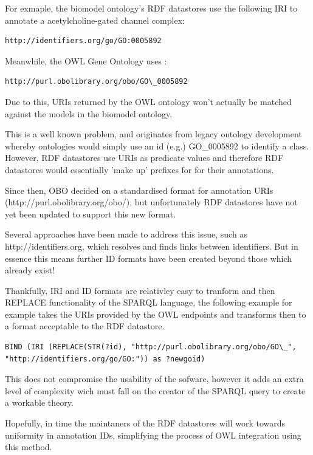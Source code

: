 \documentclass{article}
\begin{document}
For exmaple, the biomodel ontology's RDF datastores use the following IRI to annotate a
acetylcholine-gated channel complex:

\begin{lstlisting}
http://identifiers.org/go/GO:0005892
\end{lstlisting}

Meanwhile, the OWL Gene Ontology uses :

\begin{lstlisting}
http://purl.obolibrary.org/obo/GO\_0005892
\end{lstlisting}

Due to this, URIs returned by the OWL ontology won't actually be matched against
the models in the biomodel ontology.

This is a well known problem, and originates from legacy ontology development
whereby ontologies would simply use an id (e.g.) GO\_0005892 to identify a class.
However, RDF datastores use URIs as predicate values and therefore RDF
datastores would essentially 'make up' prefixes for for their annotations.

Since then, OBO decided on a standardised format for annotation URIs
(http://purl.obolibrary.org/obo/), but unfortunately RDF datastores have not yet
been updated to support this new format. 

Several approaches have been made to address this issue, such as
http://identifiers.org, which resolves and finds links between identifiers. But
in essence this means further ID formats have been created beyond those which
already exist! 

Thankfully, IRI and ID formats are relativley easy to tranform and then REPLACE
functionality of the SPARQL language, the following example for example takes
the URIs provided by the OWL endpoints and transforms then to a format
acceptable to the RDF datastore.

\begin{lstlisting}
BIND (IRI (REPLACE(STR(?id), "http://purl.obolibrary.org/obo/GO\_",
"http://identifiers.org/go/GO:")) as ?newgoid)
\end{lstlisting}

This does not compromise the usability of the sofware, however it adds an
extra level of complexity wich must fall on the creator of the SPARQL query to
create a workable theory.

Hopefully, in time the maintaners of the RDF datastores will work towards
uniformity in annotation IDs, simplifying the process of OWL integration using
this method.
\end{document}
